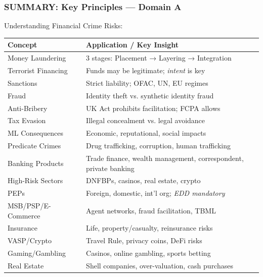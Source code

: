 \documentclass[12pt,aspectratio=169]{beamer}
\renewcommand{\scriptsize}{\fontsize{5}{6}\selectfont}
\newcommand{\keypoint}[1]{\textcolor{deepblue}{\textbf{#1}}}
\begin{document}
	\begin{frame}
		\frametitle{\fontsize{11}{13}\selectfont SUMMARY: Key Principles — Domain A}
		\scriptsize
		\begin{block}{\fontsize{9}{11}\selectfont Understanding Financial Crime Risks:}
			\vspace{0.05cm}
			\scriptsize
			\begin{longtable}{|p{}|p{}|}
				\hline
				\keypoint{Concept} & \keypoint{Application / Key Insight} \\
				\hline
				Money Laundering & 3 stages: Placement → Layering → Integration \\
				\hline
				Terrorist Financing & Funds may be legitimate; \textit{intent} is key \\
				\hline
				Sanctions & Strict liability; OFAC, UN, EU regimes \\
				\hline
				Fraud & Identity theft vs. synthetic identity fraud \\
				\hline
				Anti-Bribery & UK Act prohibits facilitation; FCPA allows \\
				\hline
				Tax Evasion & Illegal concealment vs. legal avoidance \\
				\hline
				ML Consequences & Economic, reputational, social impacts \\
				\hline
				Predicate Crimes & Drug trafficking, corruption, human trafficking \\
				\hline
				Banking Products & Trade finance, wealth management, correspondent, private banking \\
				\hline
				High-Risk Sectors & DNFBPs, casinos, real estate, crypto \\
				\hline
				PEPs & Foreign, domestic, int'l org; \textit{EDD mandatory} \\
				\hline
				MSB/PSP/E-Commerce & Agent networks, fraud facilitation, TBML \\
				\hline
				Insurance & Life, property/casualty, reinsurance risks \\
				\hline
				VASP/Crypto & Travel Rule, privacy coins, DeFi risks \\
				\hline
				Gaming/Gambling & Casinos, online gambling, sports betting \\
				\hline
				Real Estate & Shell companies, over-valuation, cash purchases \\

\end{longtable}
\end{block}
\end{frame}
\end{document}
